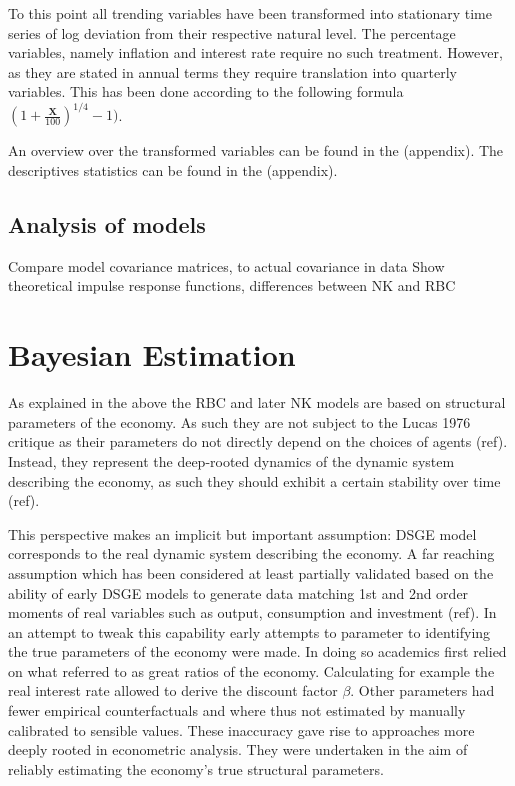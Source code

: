 \documentclass[12pt,a4paper,english]{article} %
\newcommand{\matr}[1]{\mathbf{#1}} %
\let\oldsection\section
\renewcommand\section{\clearpage\oldsection}
\begin{document}
	To this point all trending variables have been transformed into stationary time series of log deviation from their respective natural level. The percentage variables, namely inflation and interest rate require no such treatment. However, as they are stated in annual terms they require translation into quarterly variables. This has been done according to the following formula $(1 + \frac{\matr{X}}{100})^{1/4} - 1)$.
	
	An overview over the transformed variables can be found in the (appendix).
	The descriptives statistics can be found in the (appendix).
	
	\subsection{Analysis of models}
	Compare model covariance matrices, to actual covariance in data
	Show theoretical impulse response functions, differences between NK and RBC
			
	\section{Bayesian Estimation}
		
	As explained in the above the RBC and later NK models are based on structural parameters of the economy. As such they are not subject to the Lucas 1976 critique as their parameters do not  directly depend on the choices of agents (ref). Instead, they represent the deep-rooted dynamics of the dynamic system describing the economy, as such they should exhibit a certain stability over time (ref). 
	
	This perspective makes an implicit but important assumption: DSGE model corresponds to the real dynamic system describing the economy. A far reaching assumption which has been considered at least partially validated based on the ability of early DSGE models to generate data matching 1st and 2nd order moments of real variables such as output, consumption and investment (ref). 
	In an attempt to tweak this capability  early attempts to parameter to identifying the true parameters of the economy were made. In doing so academics first relied on what \cite{prescott_theory_1986} referred to as great ratios of the economy. Calculating for example the real interest rate allowed to derive the discount factor $\beta$. 
	Other parameters had fewer empirical counterfactuals and where thus not estimated by manually calibrated to sensible values. These inaccuracy gave rise to approaches more deeply rooted in econometric analysis. They were undertaken in the aim of reliably estimating the economy's true structural parameters.
	
\end{document}
